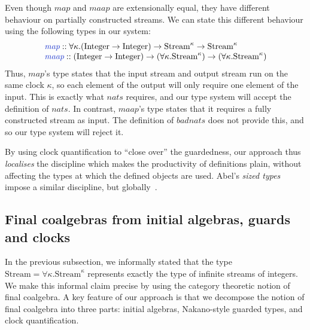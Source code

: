 \documentclass[natbib]{sigplanconf}
\newcommand{\tyname}[1]{\textrm{#1}}
\newcommand{\ident}[1]{\textit{#1}}
\newcommand{\defn}[1]{\textcolor{defnd}{\ident{#1}}}
\begin{document}
Even though $\ident{map}$ and $\ident{maap}$ are extensionally equal,
they have different behaviour on partially constructed streams. We can
state this different behaviour using the following types in our system:
\begin{displaymath}
  \begin{array}{l}
    \defn{map} :: \forall \kappa. (\tyname{Integer} \to \tyname{Integer}) \to \tyname{Stream}^\kappa \to \tyname{Stream}^\kappa \\
    \defn{maap} :: (\tyname{Integer} \to \tyname{Integer}) \to (\forall \kappa. \tyname{Stream}^\kappa) \to (\forall \kappa. \tyname{Stream}^\kappa)
  \end{array}
\end{displaymath}
Thus, $\ident{map}$'s type states that the input stream and output
stream run on the same clock $\kappa$, so each element of the output
will only require one element of the input. This is exactly what
$\ident{nats}$ requires, and our type system will accept the
definition of $\ident{nats}$. In contrast, $\ident{maap}$'s type
states that it requires a fully constructed stream as input. The
definition of $\ident{badnats}$ does not provide this, and so our type
system will reject it.

By using clock quantification to ``close over'' the guardedness, our
approach thus \emph{localises} the discipline which makes the
productivity of definitions plain, without affecting the types at
which the defined objects are used. Abel's \emph{sized types} impose a
similar discipline, but globally~\cite{abel04termination}.

\subsection{Final coalgebras from initial algebras, guards and clocks}
\label{sec:main-results-intro}

In the previous subsection, we informally stated that the type
$\tyname{Stream} = \forall \kappa. \tyname{Stream}^\kappa$ represents
exactly the type of infinite streams of integers. We make this
informal claim precise by using the category theoretic notion of final
coalgebra. A key feature of our approach is that we decompose the
notion of final coalgebra into three parts: initial algebras,
Nakano-style guarded types, and clock quantification.
\end{document}
